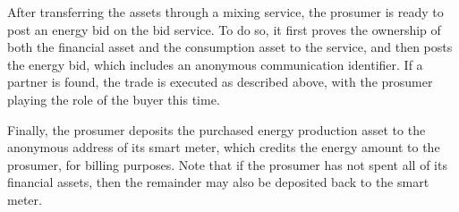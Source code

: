 After transferring the assets through a mixing service, the prosumer
is ready to post an energy bid on the bid service.  To do so, it first
proves the ownership of both the financial asset and the consumption
asset to the service, and then posts the energy bid, which includes an
anonymous communication identifier.  If a partner is found, the trade
is executed as described above, with the prosumer playing the role of
the buyer this time.

Finally, the prosumer deposits the purchased energy production asset
to the anonymous address of its smart meter, which credits the energy
amount to the prosumer, for billing purposes.  Note that if the
prosumer has not spent all of its financial assets, then the remainder
may also be deposited back to the smart meter.






